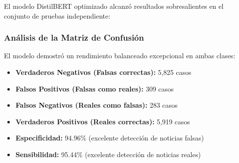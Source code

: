 El modelo DistilBERT optimizado alcanzó resultados sobresalientes en el conjunto de pruebas independiente:

\begin{table}[htbp]
\centering
{}
\caption{Métricas de rendimiento final del modelo DistilBERT en el conjunto de pruebas.}
\label{tab:metricas_distilbert}
\end{table}

\subsubsection{Análisis de la Matriz de Confusión}

El modelo demostró un rendimiento balanceado excepcional en ambas clases:

\begin{itemize}
    \item \textbf{Verdaderos Negativos (Falsas correctas):} 5,825 casos
    \item \textbf{Falsos Positivos (Falsas como reales):} 309 casos  
    \item \textbf{Falsos Negativos (Reales como falsas):} 283 casos
    \item \textbf{Verdaderos Positivos (Reales correctas):} 5,919 casos
    \item \textbf{Especificidad:} 94.96\% (excelente detección de noticias falsas)
    \item \textbf{Sensibilidad:} 95.44\% (excelente detección de noticias reales)
\end{itemize}

